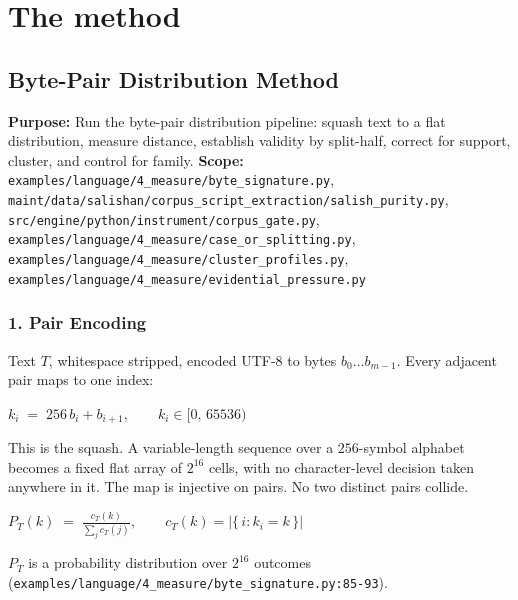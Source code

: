 \chapter{The method}

\section{Byte-Pair Distribution Method}

\textbf{Purpose:} Run the byte-pair distribution pipeline: squash text to a flat distribution, measure distance, establish validity by split-half, correct for support, cluster, and control for family. \textbf{Scope:} \texttt{examples/\allowbreak{}language/\allowbreak{}4\_\allowbreak{}measure/\allowbreak{}byte\_\allowbreak{}signature.\allowbreak{}py}, \texttt{maint/\allowbreak{}data/\allowbreak{}salishan/\allowbreak{}corpus\_\allowbreak{}script\_\allowbreak{}extraction/\allowbreak{}salish\_\allowbreak{}purity.\allowbreak{}py}, \texttt{src/\allowbreak{}engine/\allowbreak{}python/\allowbreak{}instrument/\allowbreak{}corpus\_\allowbreak{}gate.\allowbreak{}py}, \texttt{examples/\allowbreak{}language/\allowbreak{}4\_\allowbreak{}measure/\allowbreak{}case\_\allowbreak{}or\_\allowbreak{}splitting.\allowbreak{}py}, \texttt{examples/\allowbreak{}language/\allowbreak{}4\_\allowbreak{}measure/\allowbreak{}cluster\_\allowbreak{}profiles.\allowbreak{}py}, \texttt{examples/\allowbreak{}language/\allowbreak{}4\_\allowbreak{}measure/\allowbreak{}evidential\_\allowbreak{}pressure.\allowbreak{}py}

\subsection{1. Pair Encoding}

Text \(T\), whitespace stripped, encoded UTF-8 to bytes \(b_0 \dots b_{m-1}\). Every adjacent pair maps to one index:

\(k_i \;=\; 256\,b_i + b_{i+1}, \qquad k_i \in [0,\,65536)\)

This is the squash. A variable-length sequence over a \(256\)-symbol alphabet becomes a fixed flat array of \(2^{16}\) cells, with no character-level decision taken anywhere in it. The map is injective on pairs. No two distinct pairs collide.

\(P_T(k) \;=\; \frac{c_T(k)}{\sum_{j} c_T(j)}, \qquad c_T(k) = \bigl|\{\, i : k_i = k \,\}\bigr|\)

\(P_T\) is a probability distribution over \(2^{16}\) outcomes (\texttt{examples/\allowbreak{}language/\allowbreak{}4\_\allowbreak{}measure/\allowbreak{}byte\_\allowbreak{}signature.\allowbreak{}py:85-\allowbreak{}93}).

